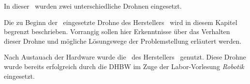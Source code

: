 
In dieser \Arbeit\ wurden zwei unterschiedliche Drohnen eingesetzt.

Die zu Beginn der \Arbeit\ eingesetzte Drohne des Herstellers \COEX\ wird in diesem Kapitel begrenzt beschrieben. Vorrangig sollen hier Erkenntnisse über das Verhalten dieser Drohne und mögliche Lösungswege der Problemstellung erläutert werden.

Nach Austauach der Hardware wurde die \Ar\ des Herstellers \Parrot\ genutzt. Diese Drohne wurde bereits erfolgreich durch die DHBW im Zuge der Labor-Vorlesung \textit{Robotik} eingesetzt.


